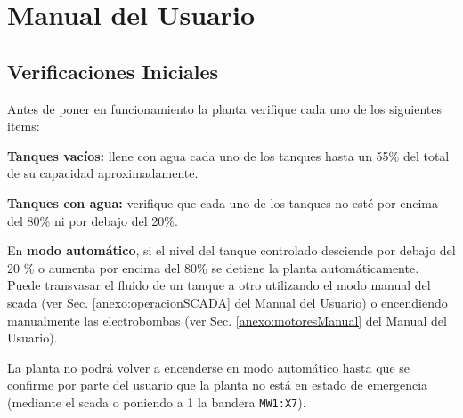 \chapter{Manual del Usuario}
\label{anexo:manualUsuario}

\section{Verificaciones Iniciales}
\label{anexo:verificaciones}
Antes de poner en funcionamiento la planta verifique cada uno de los siguientes
items:

\begin{tcolorbox}[title=Nivel de agua]
\textbf{Tanques vacíos:} llene con agua cada uno de los tanques hasta un 55\%
del total de su capacidad aproximadamente.

\textbf{Tanques con agua:} verifique que cada uno de los tanques no esté por
encima del 80\% ni por debajo del 20\%.

\end {tcolorbox}
\begin{lattention}
En \textbf{modo automático}, si el nivel del tanque controlado desciende por
debajo del 20 \% o aumenta por encima del 80\% se detiene la planta 
automáticamente. Puede transvasar el fluido de un tanque a otro utilizando el
modo manual del \gls{scada} (ver Sec. \ref{anexo:operacionSCADA} del Manual
del Usuario) o encendiendo
manualmente las electrobombas (ver Sec. \ref{anexo:motoresManual} del Manual del
Usuario).

La planta no podrá volver a encenderse en modo automático hasta que se confirme
por parte del usuario que la planta no está en estado de emergencia (mediante el
\gls{scada} o poniendo a 1 la bandera \verb|MW1:X7|).
\end{lattention}


